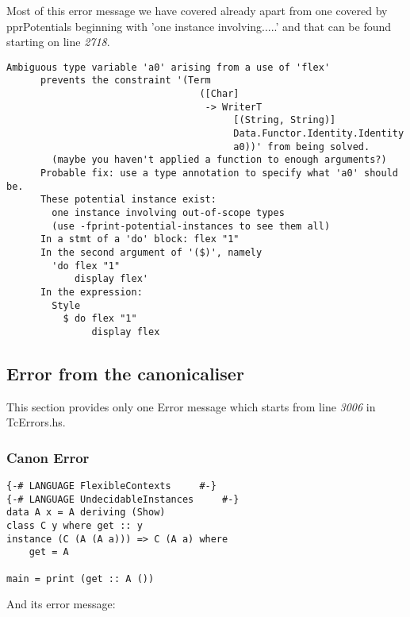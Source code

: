 \documentclass[a4paper]{article}
\begin{document}
Most of this error message we have covered already apart from one covered by pprPotentials beginning with 'one instance involving.....' and that can be found starting on line \textit{2718}. 

\begin{lstlisting}[label={lst: T21.0.2}, numbers=none, caption={Error}]
      Ambiguous type variable 'a0' arising from a use of 'flex'
      prevents the constraint '(Term
                                  ([Char]
                                   -> WriterT
                                        [(String, String)]
                                        Data.Functor.Identity.Identity
                                        a0))' from being solved.
        (maybe you haven't applied a function to enough arguments?)
      Probable fix: use a type annotation to specify what 'a0' should be.
      These potential instance exist:
        one instance involving out-of-scope types
        (use -fprint-potential-instances to see them all)
      In a stmt of a 'do' block: flex "1"
      In the second argument of '($)', namely
        'do flex "1"
            display flex'
      In the expression:
        Style
          $ do flex "1"
               display flex
\end{lstlisting}


\subsection{Error from the canonicaliser}

This section provides only one Error message which starts from line \textit{3006} in TcErrors.hs. 

\subsubsection{Canon Error}


\begin{lstlisting}[label={lst: T??.0}, numbers=none, caption={Example Program \cite{ex100}}]
{-# LANGUAGE FlexibleContexts     #-}
{-# LANGUAGE UndecidableInstances     #-}
data A x = A deriving (Show)
class C y where get :: y
instance (C (A (A a))) => C (A a) where
    get = A

main = print (get :: A ())
\end{lstlisting}

And its error message:
\end{document}
